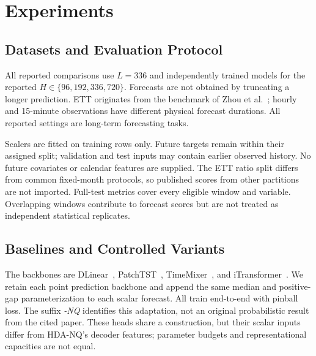 \section{Experiments}
\label{sec:experiments}

\subsection{Datasets and Evaluation Protocol}

All reported comparisons use $L=336$ and independently trained models for the reported $H\in\{96,192,336,720\}$. Forecasts are not obtained by truncating a longer prediction. ETT originates from the benchmark of Zhou et al.~\cite{zhou2021informer}; hourly and 15-minute observations have different physical forecast durations. All reported settings are long-term forecasting tasks.



Scalers are fitted on training rows only. Future targets remain within their assigned split; validation and test inputs may contain earlier observed history. No future covariates or calendar features are supplied. The ETT ratio split differs from common fixed-month protocols, so published scores from other partitions are not imported. Full-test metrics cover every eligible window and variable. Overlapping windows contribute to forecast scores but are not treated as independent statistical replicates.

\subsection{Baselines and Controlled Variants}
The backbones are DLinear~\cite{zeng2023transformers}, PatchTST~\cite{nie2023timeseries}, TimeMixer~\cite{wang2024timemixer}, and iTransformer~\cite{liu2024itransformer}. We retain each point prediction backbone and append the same median and positive-gap parameterization to each scalar forecast. All train end-to-end with pinball loss. The suffix \emph{-NQ} identifies this adaptation, not an original probabilistic result from the cited paper. These heads share a construction, but their scalar inputs differ from HDA-NQ's decoder features; parameter budgets and representational capacities are not equal.

